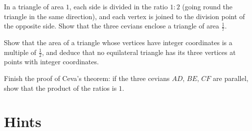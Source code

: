 \begin{exercise}[$\star\star$]\label{ex:routh}
In a triangle of area $1$, each side is divided in the ratio $1:2$ (going round the triangle in the same direction), and each vertex is
joined to the division point of the opposite side. Show that the three cevians enclose a triangle of area $\frac17$.
\end{exercise}

\begin{exercise}[$\star$]\label{ex:latticeequilateral}
Show that the area of a triangle whose vertices have integer coordinates is a multiple of $\frac12$, and deduce that no equilateral
triangle has its three vertices at points with integer coordinates.
\end{exercise}

\begin{exercise}[$\star$]\label{ex:cevaparallel}
Finish the proof of Ceva's theorem: if the three cevians $AD$, $BE$, $CF$ are parallel, show that the product of the ratios is $1$.
\end{exercise}

\section{Hints}

